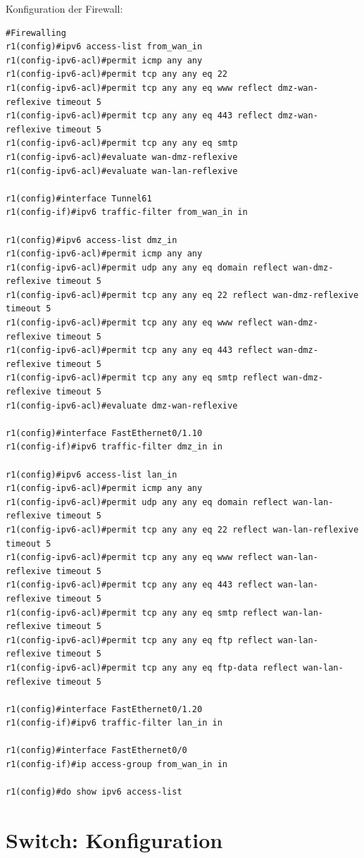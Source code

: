 Konfiguration der Firewall:
\begin{lstlisting}[numbers=none]
#Firewalling
r1(config)#ipv6 access-list from_wan_in
r1(config-ipv6-acl)#permit icmp any any
r1(config-ipv6-acl)#permit tcp any any eq 22
r1(config-ipv6-acl)#permit tcp any any eq www reflect dmz-wan-reflexive timeout 5
r1(config-ipv6-acl)#permit tcp any any eq 443 reflect dmz-wan-reflexive timeout 5
r1(config-ipv6-acl)#permit tcp any any eq smtp
r1(config-ipv6-acl)#evaluate wan-dmz-reflexive
r1(config-ipv6-acl)#evaluate wan-lan-reflexive

r1(config)#interface Tunnel61
r1(config-if)#ipv6 traffic-filter from_wan_in in

r1(config)#ipv6 access-list dmz_in
r1(config-ipv6-acl)#permit icmp any any
r1(config-ipv6-acl)#permit udp any any eq domain reflect wan-dmz-reflexive timeout 5
r1(config-ipv6-acl)#permit tcp any any eq 22 reflect wan-dmz-reflexive timeout 5
r1(config-ipv6-acl)#permit tcp any any eq www reflect wan-dmz-reflexive timeout 5
r1(config-ipv6-acl)#permit tcp any any eq 443 reflect wan-dmz-reflexive timeout 5
r1(config-ipv6-acl)#permit tcp any any eq smtp reflect wan-dmz-reflexive timeout 5
r1(config-ipv6-acl)#evaluate dmz-wan-reflexive

r1(config)#interface FastEthernet0/1.10
r1(config-if)#ipv6 traffic-filter dmz_in in

r1(config)#ipv6 access-list lan_in
r1(config-ipv6-acl)#permit icmp any any
r1(config-ipv6-acl)#permit udp any any eq domain reflect wan-lan-reflexive timeout 5
r1(config-ipv6-acl)#permit tcp any any eq 22 reflect wan-lan-reflexive timeout 5
r1(config-ipv6-acl)#permit tcp any any eq www reflect wan-lan-reflexive timeout 5
r1(config-ipv6-acl)#permit tcp any any eq 443 reflect wan-lan-reflexive timeout 5
r1(config-ipv6-acl)#permit tcp any any eq smtp reflect wan-lan-reflexive timeout 5
r1(config-ipv6-acl)#permit tcp any any eq ftp reflect wan-lan-reflexive timeout 5
r1(config-ipv6-acl)#permit tcp any any eq ftp-data reflect wan-lan-reflexive timeout 5

r1(config)#interface FastEthernet0/1.20
r1(config-if)#ipv6 traffic-filter lan_in in

r1(config)#interface FastEthernet0/0
r1(config-if)#ip access-group from_wan_in in

r1(config)#do show ipv6 access-list
\end{lstlisting}\section{Switch: Konfiguration}

